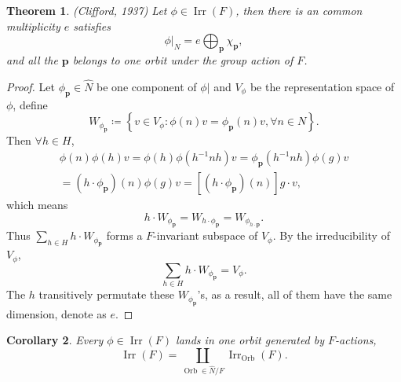 \documentclass[11pt, reqno]{amsart}
\newtheorem{theorem}{Theorem}[section]
\newtheorem{corollary}[theorem]{Corollary}
\theoremstyle{definition}
\theoremstyle{remark}
\begin{document}
\begin{theorem}
    (Clifford, 1937) Let $\phi\in \operatorname{Irr}\left(F\right)$, then there is an common multiplicity $e$ satisfies
    \begin{equation}
        \left. \phi \right|_N=e\bigoplus_{\mathbf{p}}{\chi _{\mathbf{p}}},
    \end{equation}
    and all the $\mathbf{p}$ belongs to one orbit under the group action of $F$.
\end{theorem}
\begin{proof}
    Let $\phi_\mathbf{p}\in\widehat{N}$ be one component of $\left.\phi\right|$ and $V_\phi$ be the representation space of $\phi$, define
    \begin{equation}
        W_{\phi _{\mathbf{p}}}\coloneqq \left\{ v\in V_{\phi}:\phi \left( n \right) v=\phi _{\mathbf{p}}\left( n \right) v,\forall n\in N \right\} .
    \end{equation}
    Then $\forall h\in H$,
    \begin{align}
        \phi \left( n \right) \phi \left( h \right) v=\phi \left( h \right) \phi \left( h^{-1}nh \right) v=\phi _{\mathbf{p}}\left( h^{-1}nh \right) \phi \left( g \right) v \nonumber
        \\
        =\left( h\cdot \phi _{\mathbf{p}} \right) \left( n \right) \phi \left( g \right) v=\left[ \left( h\cdot \phi _{\mathbf{p}} \right) \left( n \right) \right] g\cdot v,
    \end{align}
    which means
    \begin{equation}
        h\cdot W_{\phi _{\mathbf{p}}}=W_{h\cdot \phi _{\mathbf{p}}}=W_{\phi _{h\cdot \mathbf{p}}}.
    \end{equation}
    Thus $\sum_{h\in H}{h\cdot W_{\phi _{\mathbf{p}}}}$ forms a $F$-invariant subspace of $V_\phi$. By the irreducibility of $V_\phi$,
    \begin{equation}
        \sum_{h\in H}{h\cdot W_{\phi _{\mathbf{p}}}}=V_\phi.
    \end{equation}
    The $h$ transitively permutate these $W_{\phi_\mathbf{p}}$'s, as a result, all of them have the same dimension, denote as $e$.
\end{proof}

\begin{corollary}
    Every $\phi\in\operatorname{Irr}\left(F\right)$ lands in one orbit generated by $F$-actions,
    \begin{equation}
        \operatorname{Irr}\left( F \right) =\coprod_{\operatorname{Orb}\in \widehat{N}/F}{\operatorname{Irr}_{\operatorname{Orb}}\left( F \right)}.
    \end{equation}
\end{corollary}
\end{document}
